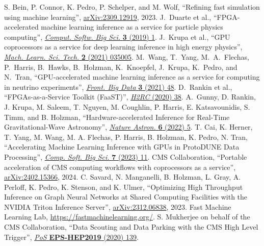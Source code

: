 \begin{thebibliography}{99}
 S. Bein, P. Connor, K. Pedro, P. Schelper, and M. Wolf, ``Refining fast simulation using machine learning'', \href{https://arxiv.org/abs/2309.12919}{arXiv:2309.12919}, 2023.
 J.~Duarte et al., ``FPGA-accelerated machine learning inference as a service for particle physics computing'', \href{https://doi.org/10.1007/s41781-019-0027-2}{\textit{Comput. Softw. Big Sci.} \textbf{3} (2019) 1}.
 J.~Krupa et al., ``GPU coprocessors as a service for deep learning inference in high energy physics'', \href{https://doi.org/10.1088/2632-2153/abec21}{\textit{Mach. Learn. Sci. Tech.} \textbf{2} (2021) 035005}.
 M.~Wang, T.~Yang, M.~A.~Flechas, P.~Harris, B.~Hawks, B.~Holzman, K.~Knoepfel, J.~Krupa, K.~Pedro, and N.~Tran, ``GPU-accelerated machine learning inference as a service for computing in neutrino experiments'', \href{https://doi.org/10.3389/fdata.2020.604083}{\textit{Front. Big Data} \textbf{3} (2021) 48}.
 D.~Rankin et al., ``FPGAs-as-a-Service Toolkit (FaaST)'', \href{https://doi.org/10.1109/H2RC51942.2020.00010}{\textit{H2RC} (2020) 38}.
 A.~Gunny, D. Rankin, J. Krupa, M. Saleem, T. Nguyen, M. Coughlin, P. Harris, E. Katsavounidis, S. Timm, and B. Holzman, ``Hardware-accelerated Inference for Real-Time Gravitational-Wave Astronomy'', \href{https://doi.org/10.1038/s41550-022-01651-w}{\textit{Nature Astron.} \textbf{6} (2022) 5}.
 T. Cai, K. Herner, T. Yang, M. Wang, M. A. Flechas, P. Harris, B. Holzman, K. Pedro, N. Tran, ``Accelerating Machine Learning Inference with GPUs in ProtoDUNE Data Processing'', \href{https://doi.org/10.1007/s41781-023-00101-0}{\textit{Comp. Soft. Big Sci.} \textbf{7} (2023) 11}.
 CMS Collaboration, ``Portable acceleration of CMS computing workflows with coprocessors as a service'', \href{https://arxiv.org/abs/2402.15366}{arXiv:2402.15366}, 2024.
 C. Savard, N. Manganelli, B. Holzman, L. Gray, A. Perloff, K. Pedro, K. Stenson, and K. Ulmer, ``Optimizing High Throughput Inference on Graph Neural Networks at Shared Computing Facilities with the NVIDIA Triton Inference Server'', \href{https://arxiv.org/abs/2312.06838}{arXiv:2312.06838}, 2023.
 Fast Machine Learning Lab, \href{https://fastmachinelearning.org/}{https://fastmachinelearning.org/}.
 S. Mukherjee on behalf of the CMS Collaboration, ``Data Scouting and Data Parking with the CMS High Level Trigger'', \href{https://doi.org/10.22323/1.364.0139}{\textit{PoS} \textbf{EPS-HEP2019} (2020) 139}.

\end{thebibliography}
